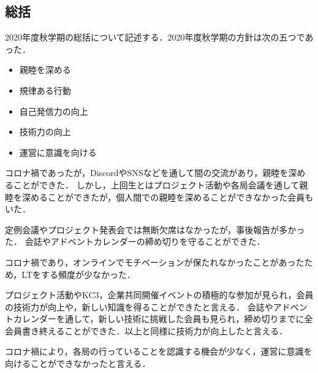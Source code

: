 \subsection*{\firstGrade{}総括}


2020年度秋学期の\firstGrade{}総括について記述する．2020年度秋学期の\firstGrade{}方針は次の五つであった．
\begin{itemize}
	\item 親睦を深める
	\item 規律ある行動
	\item 自己発信力の向上
	\item 技術力の向上
	\item 運営に意識を向ける
\end{itemize}

コロナ禍であったが，DiscordやSNSなどを通して\firstGrade{}間の交流があり，親睦を深めることができた．
しかし，上回生とはプロジェクト活動や各局会議を通して親睦を深めることができたが，個人間での親睦を深めることができなかった会員もいた．

定例会議やプロジェクト発表会では無断欠席はなかったが，事後報告が多かった．
会誌やアドベントカレンダーの締め切りを守ることができた．

コロナ禍であり，オンラインでモチベーションが保たれなかったことがあったため，LTをする頻度が少なかった．

プロジェクト活動やKC3，企業共同開催イベントの積極的な参加が見られ，\firstGrade{}会員の技術力が向上や，新しい知識を得ることができたと言える．
会誌やアドベントカレンダーを通して，新しい技術に挑戦した会員も見られ，締め切りまでに全会員書き終えることができた．以上と同様に技術力が向上したと言える．

コロナ禍により，各局の行っていることを認識する機会が少なく，運営に意識を向けることができなかったと言える．



